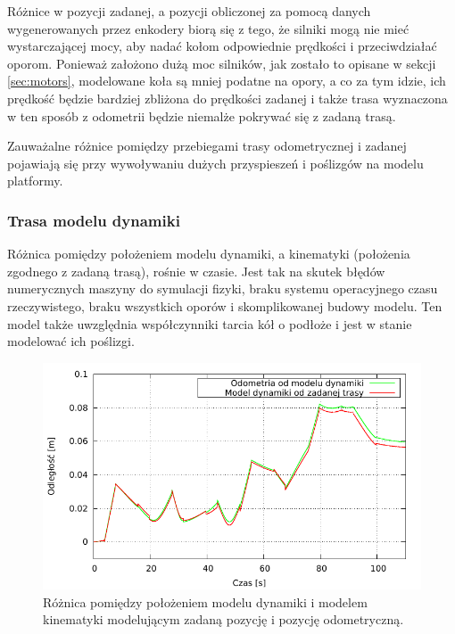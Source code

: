 			Różnice w pozycji zadanej, a pozycji obliczonej za pomocą danych wygenerowanych przez enkodery biorą się z tego, że
			silniki mogą nie mieć wystarczającej mocy, aby nadać kołom odpowiednie prędkości i przeciwdziałać oporom.
			Ponieważ założono dużą moc silników, jak zostało to opisane w sekcji \ref{sec:motors}, modelowane koła są mniej podatne na opory, a co za tym idzie, 
			ich prędkość będzie bardziej zbliżona do prędkości zadanej i także trasa wyznaczona w ten sposób z odometrii będzie niemalże pokrywać się z zadaną trasą.
			
			Zauważalne różnice pomiędzy przebiegami trasy odometrycznej i zadanej pojawiają się przy wywoływaniu dużych przyspieszeń i poślizgów na modelu platformy.
			
		\subsubsection{Trasa modelu dynamiki}
			Różnica pomiędzy położeniem modelu dynamiki, a kinematyki (położenia zgodnego z zadaną trasą), rośnie w czasie.
			Jest tak na skutek błędów numerycznych maszyny do symulacji fizyki, braku systemu operacyjnego czasu rzeczywistego, braku wszystkich oporów i skomplikowanej budowy modelu.
			Ten model także uwzględnia współczynniki tarcia kół o podłoże i jest w stanie modelować ich poślizgi.
			
			\begin{figure}[H]
				\centering
				\includegraphics[width=\textwidth]{plots/comparison_dt.pdf}
					\caption{Różnica pomiędzy położeniem modelu dynamiki i modelem kinematyki modelującym zadaną pozycję i pozycję odometryczną.}
				\label{plot:comparison_dt}
			\end{figure}
			
